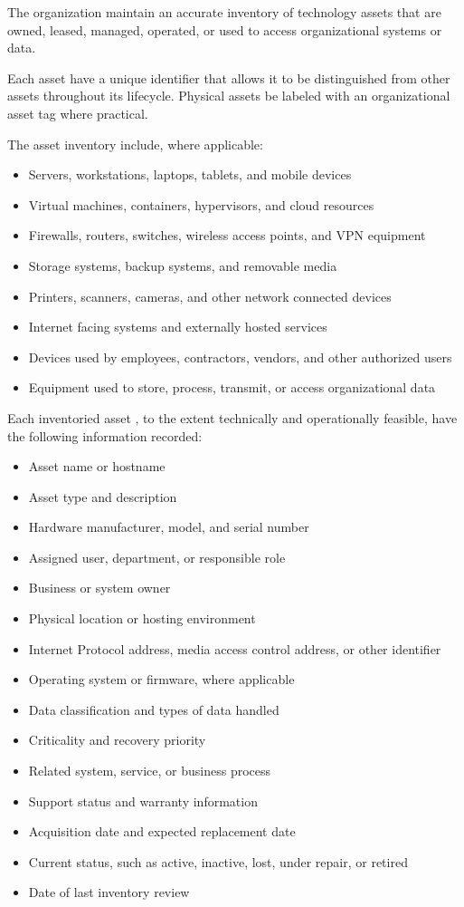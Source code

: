 The organization \must{} maintain an accurate inventory of technology assets that are owned, leased, managed, operated, or used to access organizational systems or data.

Each asset \must{} have a unique identifier that allows it to be distinguished from other assets throughout its lifecycle. Physical assets \should{} be labeled with an organizational asset tag where practical.

The asset inventory \must{} include, where applicable:
\begin{itemize}
    \item Servers, workstations, laptops, tablets, and mobile devices
    \item Virtual machines, containers, hypervisors, and cloud resources
    \item Firewalls, routers, switches, wireless access points, and VPN equipment
    \item Storage systems, backup systems, and removable media
    \item Printers, scanners, cameras, and other network connected devices
    \item Internet facing systems and externally hosted services
    \item Devices used by employees, contractors, vendors, and other authorized users
    \item Equipment used to store, process, transmit, or access organizational data
\end{itemize}

Each inventoried asset \must{}, to the extent technically and operationally feasible, have the following information recorded:
\begin{itemize}
    \item Asset name or hostname
    \item Asset type and description
    \item Hardware manufacturer, model, and serial number
    \item Assigned user, department, or responsible role
    \item Business or system owner
    \item Physical location or hosting environment
    \item Internet Protocol address, media access control address, or other identifier
    \item Operating system or firmware, where applicable
    \item Data classification and types of data handled
    \item Criticality and recovery priority
    \item Related system, service, or business process
    \item Support status and warranty information
    \item Acquisition date and expected replacement date
    \item Current status, such as active, inactive, lost, under repair, or retired
    \item Date of last inventory review
\end{itemize}

